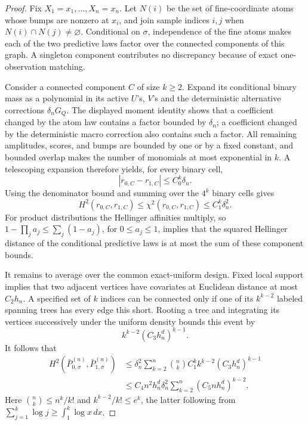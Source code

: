 \documentclass{article}
\begin{document}
\begin{proof}
Fix \(X_1=x_1,\ldots,X_n=x_n\).  Let \(N(i)\) be the set of fine-coordinate atoms whose bumps are nonzero at \(x_i\), and join sample indices \(i,j\) when \(N(i)\cap N(j)\neq\varnothing\).  Conditional on \(\sigma\), independence of the fine atoms makes each of the two predictive laws factor over the connected components of this graph.  A singleton component contributes no discrepancy because of exact one-observation matching.

Consider a connected component \(C\) of size \(k\geq2\).  Expand its conditional binary mass as a polynomial in its active \(U\)'s, \(V\)'s and the deterministic alternative corrections \(\delta_nG_Q\).  The displayed moment identity shows that a coefficient changed by the atom law contains a factor bounded by \(\delta_n\); a coefficient changed by the deterministic macro correction also contains such a factor.  All remaining amplitudes, scores, and bumps are bounded by one or by a fixed constant, and bounded overlap makes the number of monomials at most exponential in \(k\).  A telescoping expansion therefore yields, for every binary cell,
\[
 |r_{0,C}-r_{1,C}|\leq C_0^k\delta_n.
\]
Using the denominator bound and summing over the \(4^k\) binary cells gives
\[
 H^2(r_{0,C},r_{1,C})
 \leq\chi^2(r_{0,C},r_{1,C})
 \leq C_1^k\delta_n^2.
\]
For product distributions the Hellinger affinities multiply, so \(1-\prod_j a_j\leq\sum_j(1-a_j)\), for \(0\leq a_j\leq1\), implies that the squared Hellinger distance of the conditional predictive laws is at most the sum of these component bounds.

It remains to average over the common exact-uniform design.  Fixed local support implies that two adjacent vertices have covariates at Euclidean distance at most \(C_2h_n\).  A specified set of \(k\) indices can be connected only if one of its \(k^{k-2}\) labeled spanning trees has every edge this short.  Rooting a tree and integrating its vertices successively under the uniform density bounds this event by
\[
 k^{k-2}(C_3h_n^d)^{k-1}.
\]
It follows that
\[
 \begin{aligned}
 H^2(\bar P_{0,\sigma}^{(n)},\bar P_{1,\sigma}^{(n)})
 &\leq
 \delta_n^2\sum_{k=2}^n {n\choose k}C_1^k k^{k-2}(C_3h_n^d)^{k-1}\\
 &\leq C_4n^2h_n^d\delta_n^2
 \sum_{k=2}^n(C_5nh_n^d)^{k-2}.
 \end{aligned}
\]
Here \({n\choose k}\leq n^k/k!\) and \(k^{k-2}/k!\leq e^k\), the latter following from \(\sum_{j=1}^k\log j\geq\int_1^k\log x\,dx\).


\end{proof}
\end{document}
